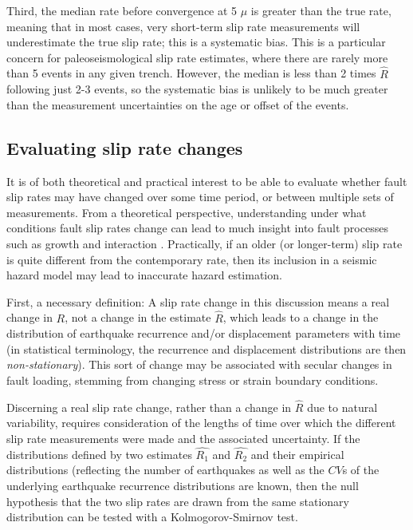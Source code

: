 \documentclass[se, manuscript]{copernicus}
\begin{document}
Third, the median rate before convergence at 5 \(\mu\) is greater than
the true rate, meaning that in most cases, very short-term slip rate
measurements will underestimate the true slip rate; this is a systematic
bias. This is a particular concern for paleoseismological slip rate
estimates, where there are rarely more than 5 events in any given
trench. However, the median is less than 2 times \(\hat{R}\) following
just 2-3 events, so the systematic bias is unlikely to be much greater
than the measurement uncertainties on the age or offset of the events.

\subsection{Evaluating slip rate
changes}\label{evaluating-slip-rate-changes}

It is of both theoretical and practical interest to be able to evaluate
whether fault slip rates may have changed over some time period, or
between multiple sets of measurements. From a theoretical perspective,
understanding under what conditions fault slip rates change can lead to
much insight into fault processes such as growth
\citep[e.g.,][]{roberts_fault_2002} and interaction
\citep[e.g.,][]{wallace_grouping_1987,dolan_long-range_2007}. Practically,
if an older (or longer-term) slip rate is quite different from the
contemporary rate, then its inclusion in a seismic hazard model may lead
to inaccurate hazard estimation.

First, a necessary definition: A slip rate change in this discussion
means a real change in \(R\), not a change in the estimate \(\hat{R}\),
which leads to a change in the distribution of earthquake recurrence
and/or displacement parameters with time (in statistical terminology,
the recurrence and displacement distributions are then
\emph{non-stationary}). This sort of change may be associated with
secular changes in fault loading, stemming from changing stress or
strain boundary conditions.

Discerning a real slip rate change, rather than a change in \(\hat{R}\)
due to natural variability, requires consideration of the lengths of
time over which the different slip rate measurements were made and the
associated uncertainty. If the distributions defined by two estimates
\(\hat{R_1}\) and \(\hat{R_2}\) and their empirical distributions
(reflecting the number of earthquakes as well as the \(CV\)s of the
underlying earthquake recurrence distributions are known, then the null
hypothesis that the two slip rates are drawn from the same stationary
distribution can be tested with a Kolmogorov-Smirnov test.
\end{document}
